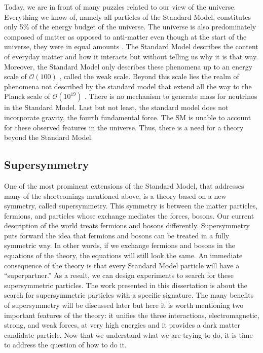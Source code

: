 Today, we are in front of many puzzles related to our view of the universe.
Everything we know of, namely all particles of the Standard Model, 
constitutes only 5\% of the energy budget of the universe. 
The universe is also predominately composed of matter as opposed to 
anti-matter even though at the start of the universe, they were in equal 
amounts%
. The Standard Model describes the content of 
everyday matter 
and how it interacts but without telling us why it is that way.
Moreover, the Standard Model only describes these phenomena 
up to an energy scale of $\mathcal{O}\left(100\right)$ \GeV, called the weak scale.
Beyond this scale lies the realm of phenomena not described by the standard 
model that extend all the way to the Planck scale of 
$\mathcal{O}\left(10^{19}\right)$ \GeV. There is no mechanism to generate mass for 
neutrinos in the Standard Model. Last but not least, the standard model 
does not incorporate gravity, the fourth fundamental force.
The SM is unable to account for these observed 
features in the universe. 
Thus, there is a need for a theory beyond the Standard Model.

\subsection*{Supersymmetry}

One of the most prominent extensions of the Standard Model, 
that addresses many of the shortcomings mentioned above, is a theory based on 
a new symmetry, called supersymmetry.
This symmetry is between the matter particles, fermions, and particles whose
exchange mediates the forces, bosons. Our current description of the world
treats fermions and bosons differently. Supersymmetry puts forward the idea
that fermions and bosons can be treated in a fully symmetric way. 
In other words,
if we exchange fermions and bosons in the equations of the theory, the 
equations will still look the same. An immediate consequence of the theory
is that every Standard Model particle will have a ``superpartner.''
As a result, we can design experiments to search for these 
supersymmetric particles. The work presented in this dissertation is about the search for supersymmetric particles with a specific signature.
The many benefits of supersymmetry will be discussed later but here it is worth 
mentioning two important features of the theory: 
it unifies the three interactions, electromagnetic, strong, and weak forces,
at very high energies 
and it provides a dark matter candidate particle. Now that we understand 
what we are trying to do, it is time to address the question of how to do it.

